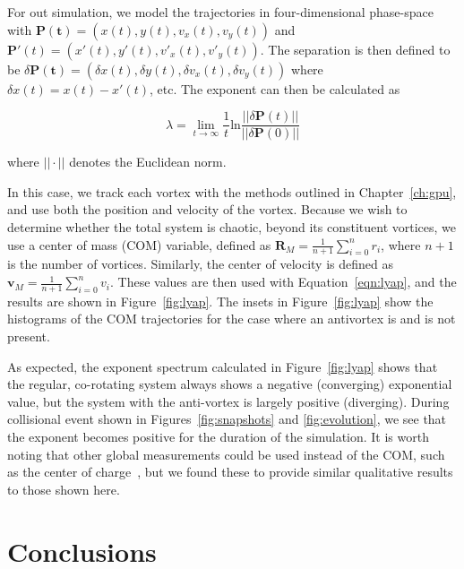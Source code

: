 For out simulation, we model the trajectories in four-dimensional phase-space with $\mathbf{P(t)} = (x(t), y(t), v_x(t), v_y(t))$ and $\mathbf{P}'(t) = (x'(t), y'(t), v'_x(t), v'_y(t))$.
The separation is then defined to be $\delta \mathbf{P(t)} = (\delta x(t), \delta y(t), \delta v_x(t), \delta v_y(t))$ where $\delta x(t) = x(t) - x'(t)$, etc.
The exponent can then be calculated as

\begin{equation}
\lambda = \lim_{t\to\infty}\frac{1}{t}\text{ln}\frac{||\delta\textbf{P}(t)||}{||\delta\textbf{P}(0)||}
\label{eqn:lyap}
\end{equation}

\noindent where $||\cdot||$ denotes the Euclidean norm.

In this case, we track each vortex with the methods outlined in Chapter~\ref{ch:gpu}, and use both the position and velocity of the vortex.
Because we wish to determine whether the total system is chaotic, beyond its constituent vortices, we use a center of mass (COM) variable, defined as $\mathbf{R}_M = \frac{1}{n+1}\sum_{i=0}^nr_i$, where $n+1$ is the number of vortices.
Similarly, the center of velocity is defined as $\mathbf{v}_M = \frac{1}{n+1}\sum_{i=0}^nv_i$.
These values are then used with Equation~\ref{eqn:lyap}, and the results are shown in Figure~\ref{fig:lyap}.
The insets in Figure~\ref{fig:lyap} show the histograms of the COM trajectories for the case where an antivortex is and is not present.

As expected, the exponent spectrum calculated in Figure~\ref{fig:lyap} shows that the regular, co-rotating system always shows a negative (converging) exponential value, but the system with the anti-vortex is largely positive (diverging).
During collisional event shown in Figures~\ref{fig:snapshots} and \ref{fig:evolution}, we see that the exponent becomes positive for the duration of the simulation.
It is worth noting that other global measurements could be used instead of the COM, such as the center of charge~\cite{kyriakopoulos2014}, but we found these to provide similar qualitative results to those shown here.


\section{Conclusions}

